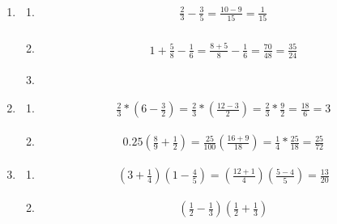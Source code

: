 \documentclass{article}
\begin{document}
\begin{enumerate}
	\item
	      \begin{enumerate}
		      \item
		            \begin{align*}
			            \frac{2}{3} - \frac{3}{5} = \frac{10 - 9}{15} 
			             = \frac{1}{15}
		            \end{align*}
		            \begin{align*}
		            \end{align*}
		      \item
		            \begin{align*}
			            1 + \frac{5}{8} - \frac{1}{6} = \frac{8 + 5}{8} - \frac{1}{6} 
			             = \frac{70}{48}  = \frac{35}{24}
		            \end{align*}
		      \item
	      \end{enumerate}
	\item
	      \begin{enumerate}
		      \item
		            \begin{align*}
			            \frac{2}{3} * \left(6 - \frac{3}{2}\right) = \frac{2}{3} * \left( \frac{12 - 3}{2} \right) 
			             = \frac{2}{3} * \frac{9}{2}                                                               
			             = \frac{18}{6}  = 3
		            \end{align*}
		      \item
		            \begin{align*}
			            0.25\left(\frac{8}{9} + \frac{1}{2}\right) = \frac{25}{100}\left(\frac{16 + 9}{18}\right) 
			             = \frac{1}{4} * \frac{25}{18}  = \frac{25}{72}
		            \end{align*}
	      \end{enumerate}
	\item
	      \begin{enumerate}
		      \item
		            \begin{align*}
			            \left(3 + \frac{1}{4}\right)\left(1 - \frac{4}{5}\right)    
			             = \left(\frac{12 + 1}{4}\right)\left(\frac{5 - 4}{5}\right) 
			             = \frac{13}{20}\end{align*}
		      \item
		            \begin{align*}
			            \left(\frac{1}{2} - \frac{1}{3}\right)\left(\frac{1}{2} + \frac{1}{3}\right) 

\end{align*}
\end{enumerate}
\end{enumerate}
\end{document}
